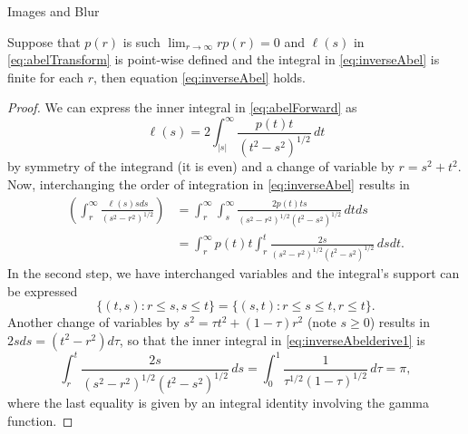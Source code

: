 \begin{chapter}{Images and Blur}
  \begin{prop}
    Suppose that $p(r)$ is such $\lim_{r\to\infty}rp(r) = 0$ and $\ell(s)$ in \eqref{eq:abelTransform} is point-wise defined and the integral in \eqref{eq:inverseAbel} is finite for each $r$, then equation \eqref{eq:inverseAbel} holds.
  \end{prop}
  \begin{proof}
  We can express the inner integral in \eqref{eq:abelForward} as
  \begin{equation}
    \ell(s) = 2\int_{|s|}^\infty \frac{p(t) t}{(t^2 - s^2)^{1/2}}\,dt \label{eq:abelForward2}
  \end{equation}
  by symmetry of the integrand (it is even) and a change of variable by $r = s^2 + t^2$.
  Now, interchanging the order of integration in \eqref{eq:inverseAbel} results in
  \begin{align} 
    \left(\int_r^\infty \frac{\ell(s) s ds}{ (s^2 - r^2)^{1/2} } \right)  
    &= \int_r^\infty\int_s^\infty \frac{2p(t) ts}{(s^2 - r^2)^{1/2}(t^2 - s^2)^{1/2}}\,dtds \nonumber\\
    &= \int_r^\infty p(t) t\int_r^t \frac{2s}{(s^2 - r^2)^{1/2}(t^2 - s^2)^{1/2}}\,dsdt. \label{eq:inverseAbelderive1}
  \end{align} 
  In the second step, we have interchanged variables and the integral's support can be expressed 
  \begin{equation} \label{eq:inverseAbleSupport}
    \{(t,s): r \le s, s\le t\} = \{(s,t): r\le s \le t, r\le t \}.
  \end{equation}
  Another change of variables by $s^2 = \tau t^2 + (1-\tau)r^2$ (note $s\ge0$) results in $2sds = (t^2 - r^2)d\tau$, 
  so that the inner integral in \eqref{eq:inverseAbelderive1} is
  \begin{equation}
    \int_r^t \frac{2s}{(s^2 - r^2)^{1/2}(t^2 - s^2)^{1/2}}\,ds
    = \int_0^1 \frac {1}{\tau^{1/2}(1-\tau)^{1/2}}\,d\tau = \pi, \label{eq:gammaIntegral}
  \end{equation}
  where the last equality is given by an integral identity involving the gamma function.

\end{proof}
\end{chapter}
